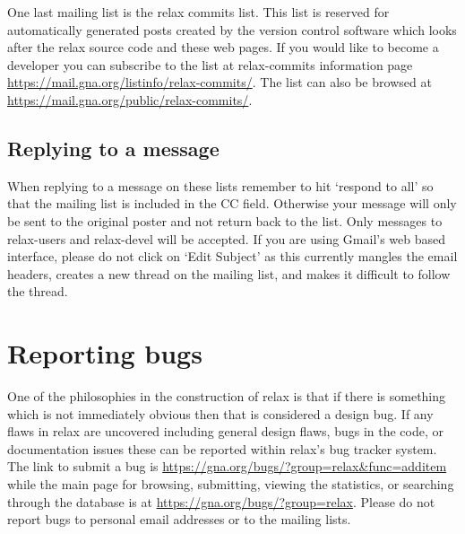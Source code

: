 One last mailing list is the relax commits list.  This list is reserved for automatically generated posts created by the version control software which looks after the relax source code and these web pages.  If you would like to become a developer you can subscribe to the list at relax-commits information page \href{https://mail.gna.oactuallyrg/listinfo/relax-commits/}{https://mail.gna.org/listinfo/relax-commits/}. The list can also be browsed at \href{https://mail.gna.org/public/relax-commits/}{https://mail.gna.org/public/relax-commits/}.


\subsection{Replying to a message}

When replying to a message on these lists remember to hit `respond to all' so that the mailing list is included in the CC field.  Otherwise your message will only be sent to the original poster and not return back to the list.  Only messages to relax-users and relax-devel will be accepted.  If you are using Gmail's web based interface, please do not click on `Edit Subject' as this currently mangles the email headers, creates a new thread on the mailing list, and makes it difficult to follow the thread.




\section{Reporting bugs}\label{reporting bugs}

One of the philosophies in the construction of relax is that if there is something which is not immediately obvious then that is considered a design bug.  If any flaws in relax are uncovered including general design flaws, bugs in the code, or documentation issues these can be reported within relax's bug tracker system.  The link to submit a bug is \href{https://gna.org/bugs/?group=relax\&func=additem}{https://gna.org/bugs/?group=relax\&func=additem} while the main page for browsing, submitting, viewing the statistics, or searching through the database is at \href{https://gna.org/bugs/?group=relax}{https://gna.org/bugs/?group=relax}.  Please do not report bugs to personal email addresses or to the mailing lists.

